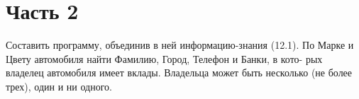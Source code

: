 \documentclass[12pt]{report}
\begin{document}
\clearpage
\begin{figure}[!h]
\end{figure}

\section*{Часть 2}

Составить программу, объединив в ней информацию-знания (12.1). По Марке и Цвету автомобиля найти Фамилию, Город, Телефон и Банки, в кото-
рых владелец автомобиля имеет вклады. Владельца может быть несколько (не более трех), один и ни одного.
\end{document}
